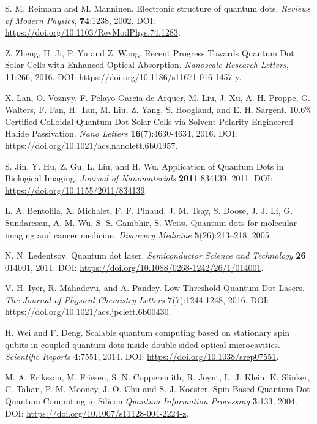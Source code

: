 \documentclass[../main.tex]{subfiles}
\begin{document}
\begin{thebibliography}{99}

 S. M. Reimann and M. Manninen. Electronic structure of quantum dots. \emph{Reviews of Modern Physics}, \textbf{74}:1238, 2002. DOI: \url{https://doi.org/10.1103/RevModPhys.74.1283}.

 Z. Zheng, H. Ji, P. Yu and Z. Wang. Recent Progress Towards Quantum Dot Solar Cells with Enhanced Optical Absorption. \emph{Nanoscale Research Letters}, \textbf{11}:266, 2016. DOI: \url{https://doi.org/10.1186/s11671-016-1457-y}.

 X. Lan, O. Voznyy, F. Pelayo García de Arquer, M. Liu, J. Xu, A. H. Proppe, G. Walters, F. Fan, H. Tan, M. Liu, Z. Yang, S. Hoogland, and E. H. Sargent. 10.6\% Certified Colloidal Quantum Dot Solar Cells via Solvent-Polarity-Engineered Halide Passivation. \emph{Nano Letters} \textbf{16}(7):4630-4634, 2016. DOI: \url{https://doi.org/10.1021/acs.nanolett.6b01957}.

 S. Jin, Y. Hu, Z. Gu, L. Liu, and H. Wu. Application of Quantum Dots in Biological Imaging. \emph{Journal of Nanomaterials} \textbf{2011}:834139, 2011. DOI: \url{https://doi.org/10.1155/2011/834139}.

 L. A. Bentolila, X. Michalet, F. F. Pinaud, J. M. Tsay, S. Doose, J. J. Li, G. Sundaresan, A. M. Wu, S. S. Gambhir, S. Weiss. Quantum dots for molecular imaging and cancer medicine. \emph{Discovery Medicine} \textbf{5}(26):213–218, 2005. 

 N. N. Ledentsov. Quantum dot laser. \emph{Semiconductor Science and Technology} \textbf{26} 014001, 2011. DOI: \url{https://doi.org/10.1088/0268-1242/26/1/014001}.

 V. H. Iyer, R. Mahadevu, and A. Pandey. Low Threshold Quantum Dot Lasers. \emph{The Journal of Physical Chemistry Letters} \textbf{7}(7):1244-1248, 2016. DOI: \url{https://doi.org/10.1021/acs.jpclett.6b00430}.

 H. Wei and F. Deng. Scalable quantum computing based on stationary spin qubits in coupled quantum dots inside double-sided optical microcavities. \emph{Scientific Reports} \textbf{4}:7551, 2014. DOI: \url{https://doi.org/10.1038/srep07551}.

 M. A. Eriksson, M. Friesen, S. N. Coppersmith, R. Joynt, L. J. Klein, K. Slinker, C. Tahan, P. M. Mooney, J. O. Chu and S. J. Koester. Spin-Based Quantum Dot Quantum Computing in Silicon.\emph{Quantum Information Processing} \textbf{3}:133, 2004. DOI: \url{https://doi.org/10.1007/s11128-004-2224-z}.


\end{thebibliography}
\end{document}

